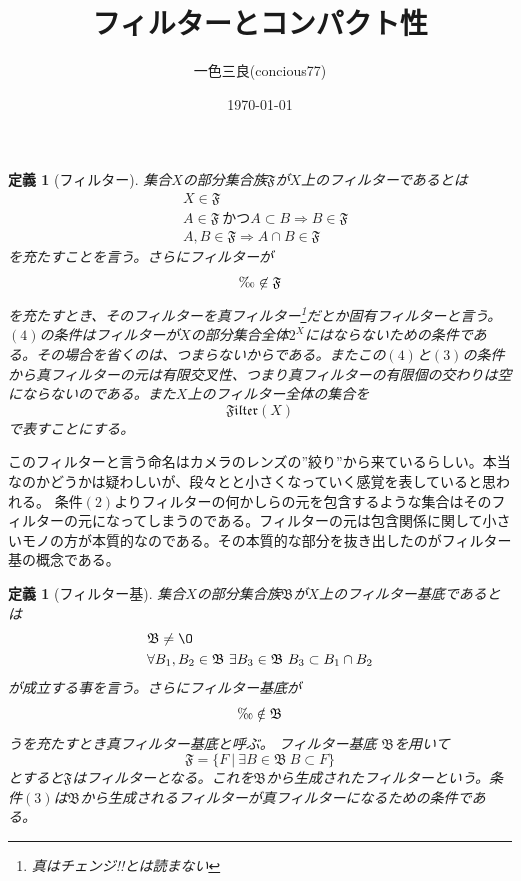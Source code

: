 \documentclass[leqno]{jsarticle}
\title{フィルターとコンパクト性}
\author{一色三良(concious77)}
\date{\today}
\newtheorem{df}[thm]{定義}
\newcommand{\fil}{\mathfrak{Filter}}
\begin{document}
\maketitle
\begin{df}[フィルター]
集合$X$の部分集合族$\mathfrak{F}$が$X$上のフィルターであるとは\\
\begin{eqnarray}
&X\in \mathfrak{F}\\
&A\in \mathfrak{F}\ かつA\subset B \Rightarrow B\in \mathfrak{F}\\
&A,B\in \mathfrak{F}\Rightarrow A\cap B\in \mathfrak{F}
\end{eqnarray}
を充たすことを言う。さらにフィルターが
\begin{eqnarray}
\O \not\in \mathfrak{F}
\end{eqnarray}
を充たすとき、そのフィルターを真フィルター\footnote{真はチェンジ!!とは読まない}だとか固有フィルターと言う。\\ 
$(4)$の条件はフィルターが$X$の部分集合全体$2^X$にはならないための条件である。その場合を省くのは、つまらないからである。またこの$(4)$と$(3)$の条件から真フィルターの元は有限交叉性、つまり真フィルターの有限個の交わりは空にならないのである。また$X$上のフィルター全体の集合を
\[
\fil(X)
\]
で表すことにする。
\end{df}
このフィルターと言う命名はカメラのレンズの”絞り”から来ているらしい。本当なのかどうかは疑わしいが、段々とと小さくなっていく感覚を表していると思われる。
条件$(2)$よりフィルターの何かしらの元を包含するような集合はそのフィルターの元になってしまうのである。フィルターの元は包含関係に関して小さいモノの方が本質的なのである。その本質的な部分を抜き出したのがフィルター基の概念である。
\begin{df}[フィルター基]
集合$X$の部分集合族$\mathfrak{B}$が$X$上のフィルター基底であるとは
\setcounter{equation}{0}
\begin{eqnarray}
&\mathfrak{B}\neq \O\\
&\forall B_1 , B_2\in \mathfrak{B}\ \exists B_3\in \mathfrak{B}\ B_3\subset B_1\cap  B_2 
\end{eqnarray}が成立する事を言う。さらにフィルター基底が
\begin{eqnarray}
\O \notin \mathfrak{B}
\end{eqnarray}
うを充たすとき真フィルター基底と呼ぶ。
フィルター基底
$\mathfrak{B}$を用いて
\[
\mathfrak{F}=\{F\ |\ \exists B\in \mathfrak{B}\ B\subset F \}
\]とすると$\mathfrak{F}$はフィルターとなる。これを$\mathfrak{B}$から生成されたフィルターという。条件$(3)$は$\mathfrak{B}$から生成されるフィルターが真フィルターになるための条件である。
\end{df}
\end{document}
